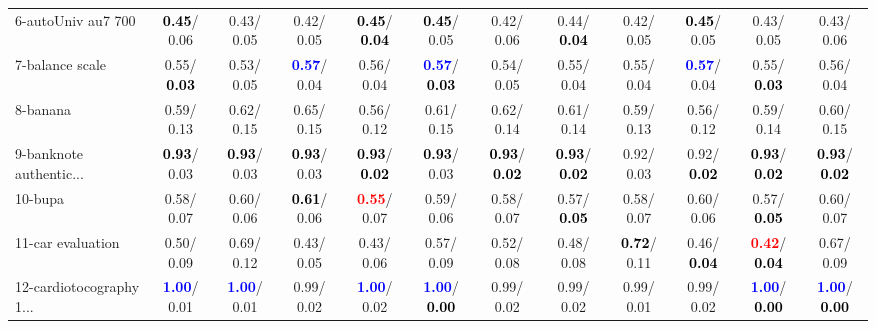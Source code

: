\begin{table}[h]
\begin{center}
{\begin{tabular}{lc|c|c|c|c|c|c|c|c|c|c}
6-autoUniv au7 700 & \textcolor{black}{\textbf{  0.45}}/  0.06 &   0.43/  0.05 &   0.42/  0.05 & \textcolor{black}{\textbf{  0.45}}/\textcolor{black}{\textbf{  0.04}} & \textcolor{black}{\textbf{  0.45}}/  0.05 &   0.42/  0.06 &   0.44/\textcolor{black}{\textbf{  0.04}} &   0.42/  0.05 & \textcolor{black}{\textbf{  0.45}}/  0.05 &   0.43/  0.05 &   0.43/  0.06 \\
7-balance scale &   0.55/\textcolor{black}{\textbf{  0.03}} &   0.53/  0.05 & \textcolor{blue}{\textbf{  0.57}}/  0.04 &   0.56/  0.04 & \textcolor{blue}{\textbf{  0.57}}/\textcolor{black}{\textbf{  0.03}} &   0.54/  0.05 &   0.55/  0.04 &   0.55/  0.04 & \textcolor{blue}{\textbf{  0.57}}/  0.04 &   0.55/\textcolor{black}{\textbf{  0.03}} &   0.56/  0.04 \\ \hline
8-banana &   0.59/  0.13 &   0.62/  0.15 &   0.65/  0.15 &   0.56/  0.12 &   0.61/  0.15 &   0.62/  0.14 &   0.61/  0.14 &   0.59/  0.13 &   0.56/  0.12 &   0.59/  0.14 &   0.60/  0.15 \\
9-banknote authentic... & \textcolor{black}{\textbf{  0.93}}/  0.03 & \textcolor{black}{\textbf{  0.93}}/  0.03 & \textcolor{black}{\textbf{  0.93}}/  0.03 & \textcolor{black}{\textbf{  0.93}}/\textcolor{black}{\textbf{  0.02}} & \textcolor{black}{\textbf{  0.93}}/  0.03 & \textcolor{black}{\textbf{  0.93}}/\textcolor{black}{\textbf{  0.02}} & \textcolor{black}{\textbf{  0.93}}/\textcolor{black}{\textbf{  0.02}} &   0.92/  0.03 &   0.92/\textcolor{black}{\textbf{  0.02}} & \textcolor{black}{\textbf{  0.93}}/\textcolor{black}{\textbf{  0.02}} & \textcolor{black}{\textbf{  0.93}}/\textcolor{black}{\textbf{  0.02}} \\
10-bupa &   0.58/  0.07 &   0.60/  0.06 & \textcolor{black}{\textbf{  0.61}}/  0.06 & \textcolor{red}{\textbf{  0.55}}/  0.07 &   0.59/  0.06 &   0.58/  0.07 &   0.57/\textcolor{black}{\textbf{  0.05}} &   0.58/  0.07 &   0.60/  0.06 &   0.57/\textcolor{black}{\textbf{  0.05}} &   0.60/  0.07 \\
11-car evaluation &   0.50/  0.09 &   0.69/  0.12 &   0.43/  0.05 &   0.43/  0.06 &   0.57/  0.09 &   0.52/  0.08 &   0.48/  0.08 & \textcolor{black}{\textbf{  0.72}}/  0.11 &   0.46/\textcolor{black}{\textbf{  0.04}} & \textcolor{red}{\textbf{  0.42}}/\textcolor{black}{\textbf{  0.04}} &   0.67/  0.09 \\
12-cardiotocography 1... & \textcolor{blue}{\textbf{  1.00}}/  0.01 & \textcolor{blue}{\textbf{  1.00}}/  0.01 &   0.99/  0.02 & \textcolor{blue}{\textbf{  1.00}}/  0.02 & \textcolor{blue}{\textbf{  1.00}}/\textcolor{black}{\textbf{  0.00}} &   0.99/  0.02 &   0.99/  0.02 &   0.99/  0.01 &   0.99/  0.02 & \textcolor{blue}{\textbf{  1.00}}/\textcolor{black}{\textbf{  0.00}} & \textcolor{blue}{\textbf{  1.00}}/\textcolor{black}{\textbf{  0.00}} \\

\end{tabular}}
\end{center}
\end{table}
